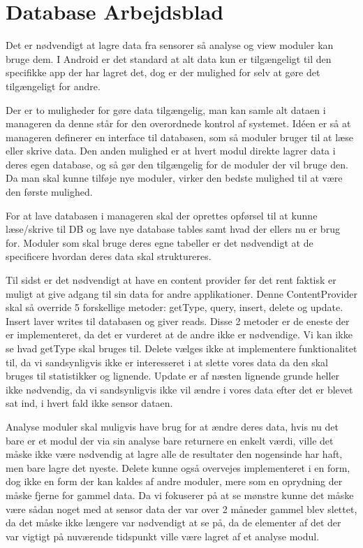 \chapter{Database Arbejdsblad}
Det er nødvendigt at lagre data fra sensorer så analyse og view moduler kan bruge dem.
I Android er det standard at alt data kun er tilgængeligt til den specifikke app der har lagret det, dog er der mulighed for selv at gøre det tilgængeligt for andre.

Der er to muligheder for gøre data tilgængelig, man kan samle alt dataen i manageren da denne står for den overordnede kontrol af systemet. Idéen er så at manageren definerer en interface til databasen, som så moduler bruger til at læse eller skrive data. 
Den anden mulighed er at hvert modul direkte lagrer data i deres egen database, og så gør den tilgængelig for de moduler der vil bruge den.
Da man skal kunne tilføje nye moduler, virker den bedste mulighed til at være den første mulighed.

For at lave databasen i manageren skal der oprettes opførsel til at kunne læse/skrive til DB og lave nye database tables samt hvad der ellers nu er brug for.
Moduler som skal bruge deres egne tabeller er det nødvendigt at de specificere hvordan deres data skal struktureres.

Til sidst er det nødvendigt at have en content provider før det rent faktisk er muligt at give adgang til sin data for andre applikationer.
Denne ContentProvider skal så override 5 forskellige metoder:  getType, query, insert, delete og update.
Insert laver writes til databasen og giver reads.
Disse 2 metoder er de eneste der er implementeret, da det er vurderet at de andre ikke er nødvendige.
Vi kan ikke se hvad getType skal bruges til.
Delete vælges ikke at implementere funktionalitet til, da vi sandsynligvis ikke er interesseret i at slette vores data da den skal bruges til statistikker og lignende.
Update er af næsten lignende grunde heller ikke nødvendig, da vi sandsynligvis ikke vil ændre i vores data efter det er blevet sat ind, i hvert fald ikke sensor dataen.

Analyse moduler skal muligvis have brug for at ændre deres data, hvis nu det bare er et modul der via sin analyse bare returnere en enkelt værdi, ville det måske ikke være nødvendig at lagre alle de resultater den nogensinde har haft, men bare lagre det nyeste.
Delete kunne også overvejes implementeret i en form, dog ikke en form der kan kaldes af andre moduler, mere som en oprydning der måske fjerne for gammel data. Da vi fokuserer på at se mønstre kunne det måske være sådan noget med at sensor data der var over 2 måneder gammel blev slettet, da det måske ikke længere var nødvendigt at se på, da de elementer af det der var vigtigt på nuværende tidspunkt ville være lagret af et analyse modul.